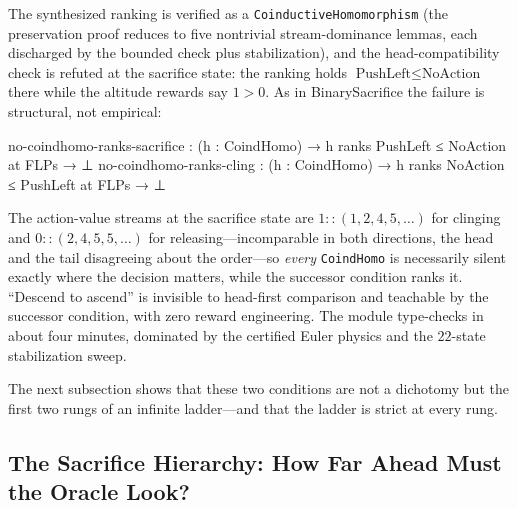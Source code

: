 \documentclass[9pt,a4paper]{article}
\theoremstyle{plain}
\theoremstyle{definition}
\theoremstyle{remark}
\begin{document}
The synthesized ranking is verified as a \texttt{CoinductiveHomomorphism} (the preservation proof reduces to five nontrivial stream-dominance lemmas, each discharged by the bounded check plus stabilization), and the head-compatibility check is refuted at the sacrifice state: the ranking holds $\text{PushLeft} \le \text{NoAction}$ there while the altitude rewards say $1 > 0$.  As in BinarySacrifice the failure is structural, not empirical:
\begin{spec}
no-coindhomo-ranks-sacrifice : (h : CoindHomo) → h ranks PushLeft ≤ NoAction at FLPs → ⊥
no-coindhomo-ranks-cling     : (h : CoindHomo) → h ranks NoAction ≤ PushLeft at FLPs → ⊥
\end{spec}
The action-value streams at the sacrifice state are $1 \mathbin{::} (1,2,4,5,\ldots)$ for clinging and $0 \mathbin{::} (2,4,5,5,\ldots)$ for releasing---incomparable in both directions, the head and the tail disagreeing about the order---so \emph{every} \texttt{CoindHomo} is necessarily silent exactly where the decision matters, while the successor condition ranks it.  ``Descend to ascend'' is invisible to head-first comparison and teachable by the successor condition, with zero reward engineering.  The module type-checks in about four minutes, dominated by the certified Euler physics and the $22$-state stabilization sweep.

The next subsection shows that these two conditions are not a dichotomy but the first two rungs of an infinite ladder---and that the ladder is strict at every rung.

\subsection{The Sacrifice Hierarchy: How Far Ahead Must the Oracle Look?}
\label{sec:sacrifice-hierarchy}
\end{document}
